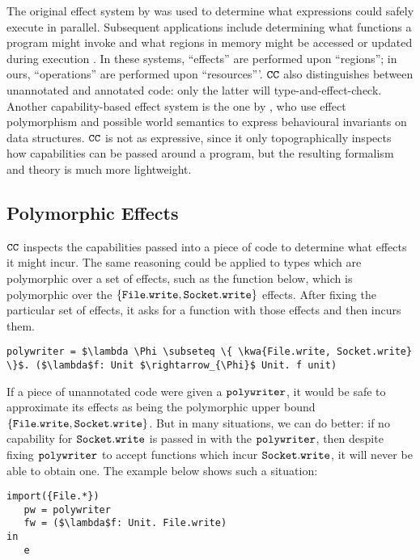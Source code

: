 The original effect system by \citet{lucassen88} was used to determine what expressions could safely execute in parallel. Subsequent applications include determining what functions a program might invoke \cite{tang94} and what regions in memory might be accessed or updated during execution \cite{talpin94}. In these systems, ``effects'' are performed upon ``regions''; in ours, ``operations'' are performed upon ``resources'''. $\mathtt{CC}$ also distinguishes between unannotated and annotated code: only the latter will type-and-effect-check. Another capability-based effect system is the one by \citet{devriese16}, who use effect polymorphism and possible world semantics to express behavioural invariants on data structures. $\mathtt{CC}$ is not as expressive, since it only topographically inspects how capabilities can be passed around a program, but the resulting formalism and theory is much more lightweight.


\subsection{Polymorphic Effects}

$\mathtt{CC}$ inspects the capabilities passed into a piece of code to determine what effects it might incur. The same reasoning could be applied to types which are polymorphic over a set of effects, such as the function below, which is polymorphic over the $\{ \mathtt{File.write, Socket.write} \}$ effects. After fixing the particular set of effects, it asks for a function with those effects and then incurs them.

\begin{lstlisting}
polywriter = $\lambda \Phi \subseteq \{ \kwa{File.write, Socket.write} \}$. ($\lambda$f: Unit $\rightarrow_{\Phi}$ Unit. f unit)
\end{lstlisting}

If a piece of unannotated code were given a $\mathtt{polywriter}$, it would be safe to approximate its effects as being the polymorphic upper bound $\{ \mathtt{File.write, Socket.write} \}$. But in many situations, we can do better: if no capability for $\mathtt{Socket.write}$ is passed in with the $\mathtt{polywriter}$, then despite fixing $\mathtt{polywriter}$ to accept functions which incur $\mathtt{Socket.write}$, it will never be able to obtain one. The example below shows such a situation:

\begin{lstlisting}
import({File.*}) 
   pw = polywriter
   fw = ($\lambda$f: Unit. File.write)
in
   e
\end{lstlisting}

